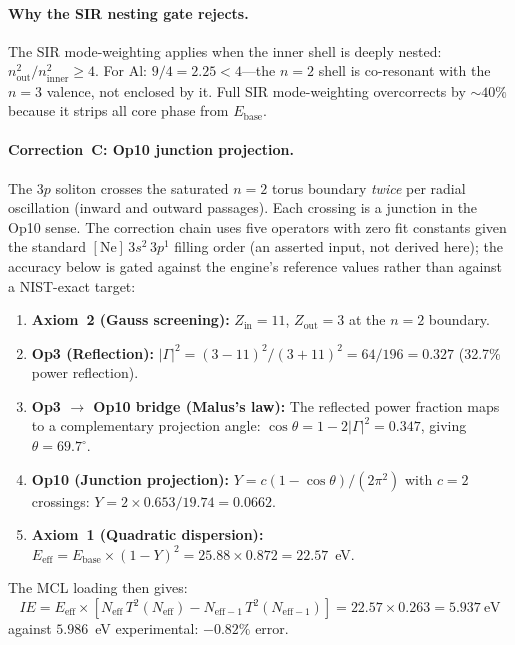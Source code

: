 \paragraph{Why the SIR nesting gate rejects.}
The SIR mode-weighting applies when the inner shell is deeply nested: $n_\text{out}^2/n_\text{inner}^2 \geq 4$.  For Al: $9/4 = 2.25 < 4$---the $n = 2$ shell is co-resonant with the $n = 3$ valence, not enclosed by it.  Full SIR mode-weighting overcorrects by $\sim 40\%$ because it strips all core phase from $E_\text{base}$.

\paragraph{Correction~C: Op10 junction projection.}
The $3p$ soliton crosses the saturated $n = 2$ torus boundary \emph{twice} per radial oscillation (inward and outward passages).  Each crossing is a junction in the Op10 sense.  The correction chain uses five operators with zero fit constants given the standard $[\text{Ne}]\,3s^2\,3p^1$ filling order (an asserted input, not derived here); the accuracy below is gated against the engine's reference values rather than against a NIST-exact target:

\begin{enumerate}
    \item \textbf{Axiom~2 (Gauss screening):}  $Z_\text{in} = 11$, $Z_\text{out} = 3$ at the $n = 2$ boundary.
    \item \textbf{Op3 (Reflection):}  $|\Gamma|^2 = (3-11)^2/(3+11)^2 = 64/196 = 0.327$ (32.7\% power reflection).
    \item \textbf{Op3 $\to$ Op10 bridge (Malus's law):}  The reflected power fraction maps to a complementary projection angle: $\cos\theta = 1 - 2|\Gamma|^2 = 0.347$, giving $\theta = 69.7^\circ$.
    \item \textbf{Op10 (Junction projection):}  $Y = c(1 - \cos\theta)/(2\pi^2)$ with $c = 2$ crossings: $Y = 2 \times 0.653 / 19.74 = 0.0662$.
    \item \textbf{Axiom~1 (Quadratic dispersion):}  $E_\text{eff} = E_\text{base} \times (1 - Y)^2 = 25.88 \times 0.872 = 22.57$~eV.
\end{enumerate}

The MCL loading then gives:
\[
    IE = E_\text{eff} \times [N_\text{eff}\,T^2(N_\text{eff}) - N_{\text{eff}-1}\,T^2(N_{\text{eff}-1})] = 22.57 \times 0.263 = 5.937~\text{eV}
\]
against $5.986$~eV experimental: $\boxed{-0.82\%}$ error.

